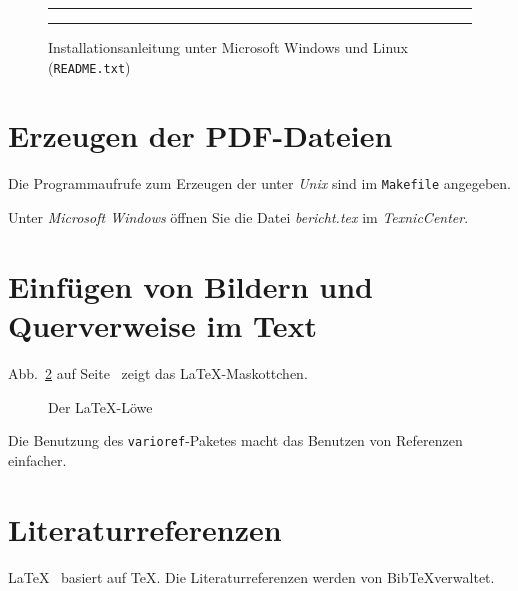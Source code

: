 \begin{figure}[h]
  \centering
  \hrule
  \caption{Installationsanleitung unter Microsoft Windows und Linux (\texttt{README.txt})}
  \label{fig-readme}
  \hrule
\end{figure}


\section{Erzeugen der PDF-Dateien}

Die Programmaufrufe zum Erzeugen der  unter \emph{Unix}
sind im \texttt{Makefile} angegeben.

Unter \emph{Microsoft Windows} öffnen Sie die Datei \emph{bericht.tex} im \emph{TexnicCenter}.

\section{Einfügen von Bildern und Querverweise im Text}


Abb.~\ref{fig-loewe} auf Seite~\pageref{fig-loewe} zeigt das \LaTeX-Maskottchen.
\begin{figure}[htbp]
\centering
{}
\caption{\label{fig-loewe}Der \LaTeX-Löwe}
\end{figure}

Die Benutzung des \texttt{varioref}-Paketes macht das Benutzen von Referenzen einfacher.


\section{Literaturreferenzen}

\LaTeX\ \cite{lamport.1995a} basiert auf \TeX \cite{knuth.1984a}.
Die Literaturreferenzen werden von Bib\TeX verwaltet.

